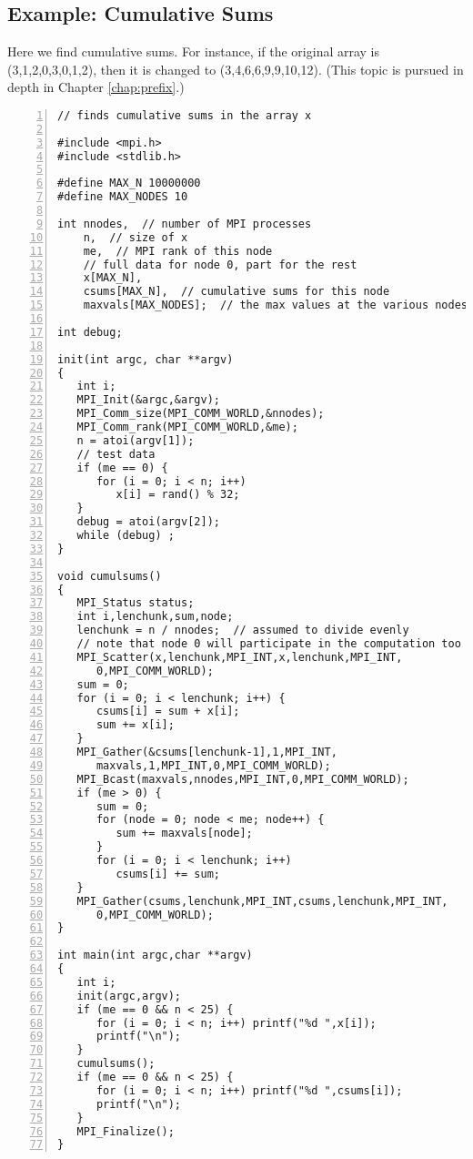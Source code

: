 \subsection{Example:  Cumulative Sums}

Here we find cumulative sums.  For instance, if the original array is
(3,1,2,0,3,0,1,2), then it is changed to (3,4,6,6,9,9,10,12).  (This
topic is pursued in depth in Chapter \ref{chap:prefix}.)

\begin{lstlisting}[numbers=left]
// finds cumulative sums in the array x

#include <mpi.h>
#include <stdlib.h>

#define MAX_N 10000000  
#define MAX_NODES 10

int nnodes,  // number of MPI processes
    n,  // size of x
    me,  // MPI rank of this node
    // full data for node 0, part for the rest
    x[MAX_N],  
    csums[MAX_N],  // cumulative sums for this node
    maxvals[MAX_NODES];  // the max values at the various nodes 

int debug; 

init(int argc, char **argv)
{  
   int i;
   MPI_Init(&argc,&argv);
   MPI_Comm_size(MPI_COMM_WORLD,&nnodes);
   MPI_Comm_rank(MPI_COMM_WORLD,&me); 
   n = atoi(argv[1]); 
   // test data
   if (me == 0) {
      for (i = 0; i < n; i++) 
         x[i] = rand() % 32;
   } 
   debug = atoi(argv[2]); 
   while (debug) ;
}

void cumulsums()
{  
   MPI_Status status;
   int i,lenchunk,sum,node; 
   lenchunk = n / nnodes;  // assumed to divide evenly
   // note that node 0 will participate in the computation too
   MPI_Scatter(x,lenchunk,MPI_INT,x,lenchunk,MPI_INT,
      0,MPI_COMM_WORLD);
   sum = 0;
   for (i = 0; i < lenchunk; i++) {
      csums[i] = sum + x[i];
      sum += x[i];
   }
   MPI_Gather(&csums[lenchunk-1],1,MPI_INT,
      maxvals,1,MPI_INT,0,MPI_COMM_WORLD);
   MPI_Bcast(maxvals,nnodes,MPI_INT,0,MPI_COMM_WORLD);
   if (me > 0) {
      sum = 0;
      for (node = 0; node < me; node++) {
         sum += maxvals[node];
      }
      for (i = 0; i < lenchunk; i++) 
         csums[i] += sum;
   }
   MPI_Gather(csums,lenchunk,MPI_INT,csums,lenchunk,MPI_INT,
      0,MPI_COMM_WORLD);
}

int main(int argc,char **argv)
{  
   int i;
   init(argc,argv);
   if (me == 0 && n < 25) {
      for (i = 0; i < n; i++) printf("%d ",x[i]);
      printf("\n");
   }
   cumulsums();
   if (me == 0 && n < 25) {
      for (i = 0; i < n; i++) printf("%d ",csums[i]);
      printf("\n");
   }
   MPI_Finalize();
}
\end{lstlisting}

